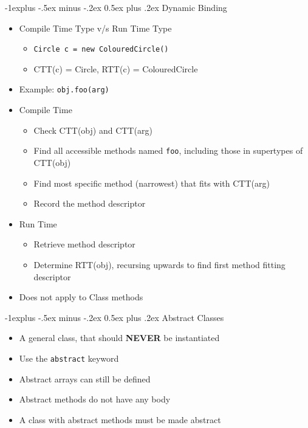 \documentclass[10pt, landscape]{article}
\makeatletter
\renewcommand{\section}{\@startsection{section}{1}{0mm}%
                                {-1ex plus -.5ex minus -.2ex}%
                                {0.5ex plus .2ex}%
                                {\normalfont\large\bfseries}}
\renewcommand{\section}{\@startsection{section}{2}{0mm}%
                                {-1explus -.5ex minus -.2ex}%
                                {0.5ex plus .2ex}%
                                {\normalfont\normalsize\bfseries}}
\makeatother
\begin{document}
\begin{multicols*}{4}
\section{Dynamic Binding}
\begin{itemize}
    \item Compile Time Type v/s Run Time Type
    \begin{itemize}
        \item \verb|Circle c = new ColouredCircle()|
        \item CTT(c) = Circle, RTT(c) = ColouredCircle
    \end{itemize}
    \item Example: \verb|obj.foo(arg)|
    \item Compile Time
    \begin{itemize}
        \item Check CTT(obj) and CTT(arg)
        \item Find all accessible methods named \verb|foo|, including those in supertypes of CTT(obj)
        \item Find most specific method (narrowest) that fits with CTT(arg)
        \item Record the method descriptor
    \end{itemize}
    \item Run Time
    \begin{itemize}
        \item Retrieve method descriptor
        \item Determine RTT(obj), recursing upwards to find first method fitting descriptor
    \end{itemize}
    \item Does not apply to Class methods
\end{itemize}

\section{Abstract Classes}
\begin{itemize}
    \item A general class, that should \textbf{NEVER} be instantiated
    \item Use the \verb|abstract| keyword
    \item Abstract arrays can still be defined
    \item Abstract methods do not have any body
    \item A class with abstract methods must be made abstract
\end{itemize}


\end{multicols*}
\end{document}
